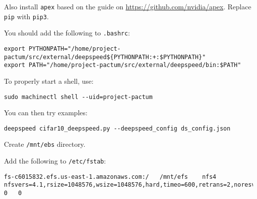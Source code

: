 Also install \lstinline|apex| based on the guide on \url{https://github.com/nvidia/apex}.
Replace \lstinline|pip| with \lstinline|pip3|.

You should add the following to \texttt{.bashrc}:

\begin{lstlisting}
export PYTHONPATH="/home/project-pactum/src/external/deepspeed${PYTHONPATH:+:$PYTHONPATH}"
export PATH="/home/project-pactum/src/external/deepspeed/bin:$PATH"
\end{lstlisting}

To properly start a shell, use:

\begin{lstlisting}
sudo machinectl shell --uid=project-pactum
\end{lstlisting}

You can then try examples:

\begin{lstlisting}
deepspeed cifar10_deepspeed.py --deepspeed_config ds_config.json
\end{lstlisting}

Create \lstinline|/mnt/ebs| directory.

Add the following to \lstinline|/etc/fstab|:

\begin{lstlisting}
fs-c6015832.efs.us-east-1.amazonaws.com:/   /mnt/efs    nfs4    nfsvers=4.1,rsize=1048576,wsize=1048576,hard,timeo=600,retrans=2,noresvport 0   0
\end{lstlisting}
